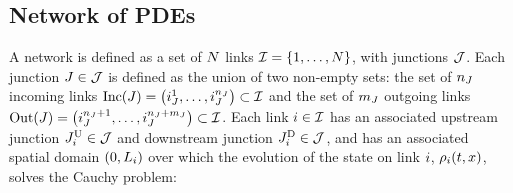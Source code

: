 \subsection{Network of PDEs\label{sub:Network-of-PDE's}}

A network
is defined as a set of $N$ links $\links=\intrange 1{\nlinks}$,
with junctions $\mathcal{J}$. Each junction $J\in\mathcal{J}$ is defined
as the union of  two non-empty sets: the set of $n_{J}$ incoming links $\Inc\left(\jn\right)=\tuple{\jlink{\jn}1}{\jlink{\jn}{\ninc_{\jn}}}\subset\links$
and the set of $m_{J}$ outgoing links $\Out\left(\jn\right)=\tuple{\jlink{\jn}{\ninc_{\jn}+1}}{\jlink{\jn}{\ninc_{\jn}+\nout_{\jn}}}\subset\links$.
Each link $i\in\mathcal{I}$ has an associated upstream junction $J_{i}^{\text{U}}\in\mathcal{J}$
and downstream junction $J_{i}^{\text{D}}\in\mathcal{J}$, and has an associated
spatial domain $\left(0,L_{\link}\right)$ over which the evolution
of the state on link $i$, $\cvar_{\link}\left(t,x\right)$, solves
the Cauchy problem:

